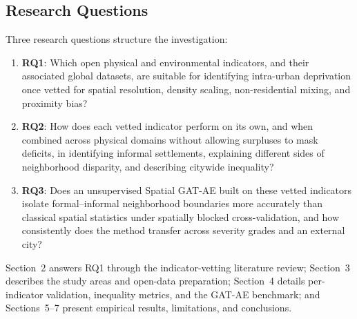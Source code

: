 \subsection{Research Questions}
Three research questions structure the investigation:
\begin{enumerate}
    \item \textbf{RQ1}: Which open physical and environmental indicators, and their associated global datasets, are suitable for identifying intra-urban deprivation once vetted for spatial resolution, density scaling, non-residential mixing, and proximity bias?
    \item \textbf{RQ2}: How does each vetted indicator perform on its own, and when combined across physical domains without allowing surpluses to mask deficits, in identifying informal settlements, explaining different sides of neighborhood disparity, and describing citywide inequality?
    \item \textbf{RQ3}: Does an unsupervised Spatial GAT-AE built on these vetted indicators isolate formal--informal neighborhood boundaries more accurately than classical spatial statistics under spatially blocked cross-validation, and how consistently does the method transfer across severity grades and an external city?
\end{enumerate}

Section~2 answers RQ1 through the indicator-vetting literature review; Section~3 describes the study areas and open-data preparation; Section~4 details per-indicator validation, inequality metrics, and the GAT-AE benchmark; and Sections~5--7 present empirical results, limitations, and conclusions.
